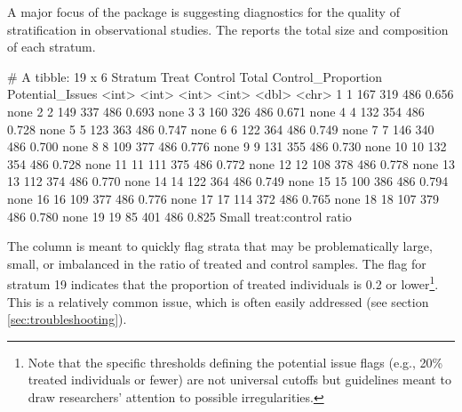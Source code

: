 A major focus of the  package is suggesting diagnostics for the quality of stratification in observational studies.  The  reports the total size and composition of each stratum.

\begin{example}
# A tibble: 19 x 6
   Stratum Treat Control Total Control_Proportion Potential_Issues         
     <int> <int>   <int> <int>              <dbl> <chr>                    
 1       1   167     319   486              0.656 none                     
 2       2   149     337   486              0.693 none                     
 3       3   160     326   486              0.671 none                     
 4       4   132     354   486              0.728 none                     
 5       5   123     363   486              0.747 none                     
 6       6   122     364   486              0.749 none                     
 7       7   146     340   486              0.700 none                     
 8       8   109     377   486              0.776 none                     
 9       9   131     355   486              0.730 none                     
10      10   132     354   486              0.728 none                     
11      11   111     375   486              0.772 none                     
12      12   108     378   486              0.778 none                     
13      13   112     374   486              0.770 none                     
14      14   122     364   486              0.749 none                     
15      15   100     386   486              0.794 none                     
16      16   109     377   486              0.776 none                     
17      17   114     372   486              0.765 none                     
18      18   107     379   486              0.780 none                     
19      19    85     401   486              0.825 Small treat:control ratio
\end{example}

The  column is meant to quickly flag strata that may be problematically large, small, or imbalanced in the ratio of treated and control samples.  The  flag for stratum 19 indicates that the proportion of treated individuals is 0.2 or lower\footnote{Note that the specific thresholds defining the potential issue flags (e.g., 20\% treated individuals or fewer) are not universal cutoffs but guidelines meant to draw researchers' attention to possible irregularities.}.  This is a relatively common issue, which is often easily addressed (see section \ref{sec:troubleshooting}).

